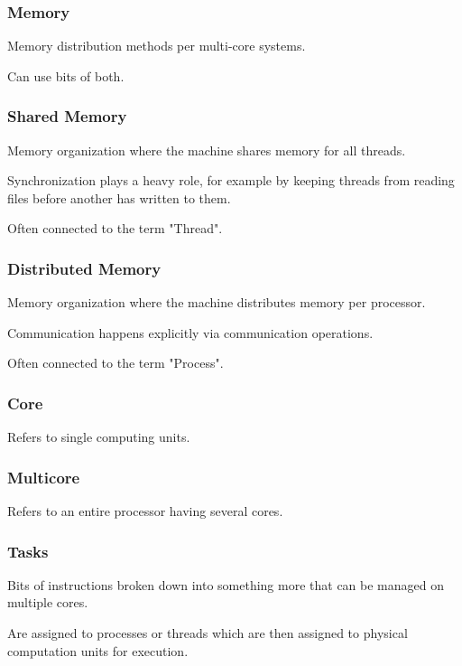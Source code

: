 \documentclass{article}
\begin{document}
\subsubsection{Memory}

Memory distribution methods per multi-core systems.

Can use bits of both.

\subsubsection{Shared Memory}

Memory organization where the machine shares memory for all threads.

Synchronization plays a heavy role, for example by keeping threads from reading files before another has written to them.

Often connected to the term "Thread".

\subsubsection{Distributed Memory}

Memory organization where the machine distributes memory per processor.

Communication happens explicitly via communication operations.

Often connected to the term "Process".

\subsubsection{Core}

Refers to single computing units.

\subsubsection{Multicore}

Refers to an entire processor having several cores.

\subsubsection{Tasks}

Bits of instructions broken down into something more that can be managed on multiple cores.

Are assigned to processes or threads which are then assigned to physical computation units for execution.
\end{document}
